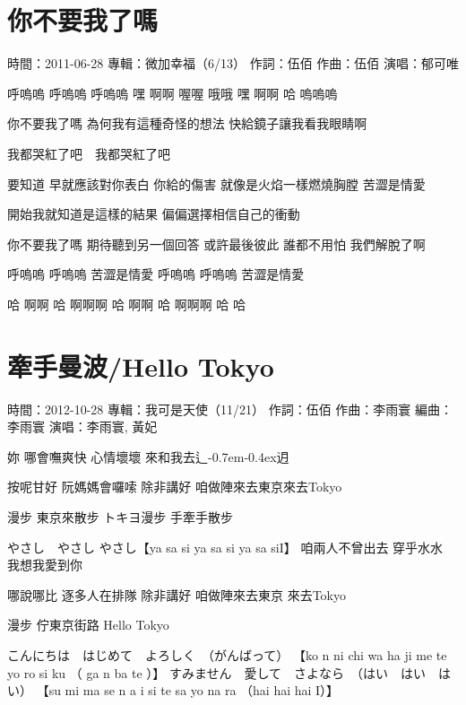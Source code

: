 \documentclass[UTF8,a4paper,oneside,twocolumn,12pt]{ctexbook}
\newcommand{\infopair}[2]{\textbullet #1：#2}
\newcommand{\zc}[1][伍佰]{\infopair{作詞}{#1}}
\newcommand{\zq}[1][伍佰]{\infopair{作曲}{#1}}
\newcommand{\bq}[1][伍佰]{\infopair{編曲}{#1}}
\newcommand{\zj}[1]{\infopair{專輯}{#1}}
\newcommand{\sj}[1]{\infopair{時間}{#1}}
\newcommand{\tshittho}{\hbox{辶\kern-0.7em\lower-0.4ex\hbox{\scalebox{0.7}{日}}}迌}
\newenvironment{info}{\begin{flushleft}\kaishu
	}
	{\end{flushleft}\normalsize\yahei\par}
\newenvironment{lyric}{
	}
{}
\begin{document}
\section{你不要我了嗎}
\begin{info}
	\sj{2011-06-28}
	\zj{微加幸福（6/13）}
	\zc
	\zq
	\infopair{演唱}{郁可唯}
\end{info}
\begin{lyric}
	呼嗚嗚 呼嗚嗚 呼嗚嗚
	嘿 啊啊 喔喔 哦哦
	嘿 啊啊 哈 嗚嗚嗚

	你不要我了嗎  為何我有這種奇怪的想法
	快給鏡子讓我看我眼睛啊

	我都哭紅了吧　我都哭紅了吧

	要知道 早就應該對你表白
	你給的傷害 就像是火焰一樣燃燒胸膛 苦澀是情愛

	開始我就知道是這樣的結果
	偏偏選擇相信自己的衝動

	你不要我了嗎  期待聽到另一個回答
	或許最後彼此  誰都不用怕  我們解脫了啊

	呼嗚嗚 呼嗚嗚  苦澀是情愛
	呼嗚嗚 呼嗚嗚  苦澀是情愛

	哈 啊啊 哈 啊啊啊
	哈 啊啊 哈 啊啊啊 哈 哈
\end{lyric}

\section{牽手曼波/Hello Tokyo}
\begin{info}
	\sj{2012-10-28}
	\zj{我可是天使（11/21）}
	\zc
	\zq[李雨寰]
	\bq[李雨寰]
	\infopair{演唱}{李雨寰, 黃妃}
\end{info}
\begin{lyric}
	妳 哪會嘸爽快 心情壞壞
	來和我去\tshittho{}

	按呢甘好 阮媽媽會囉嗦
	除非講好 咱做陣來去東京來去Tokyo

	漫步 東京來散步
	トキヨ漫步 手牽手散步

	やさし　やさし やさし【ya sa si ya sa si ya sa siI】
	咱兩人不曾出去 穿乎水水
	我想我愛到你

	哪說哪比 逐多人在排隊
	除非講好 咱做陣來去東京 來去Tokyo

	漫步 佇東京街路 Hello Tokyo

	こんにちは　はじめて　よろしく　（がんばって）
	【ko n ni chi wa ha ji me te yo ro si ku （ ga n ba te ）】
	すみません　愛して　さよなら　（はい　はい　はい）
	【su mi ma se n a i si te sa yo na ra （hai hai hai I）】
\end{lyric}
\end{document}
